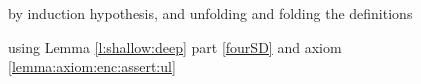 \begin{description}
% 
 
  \item[{}]  by induction hypothesis, and unfolding and folding the definitions
  
 \item[{}]  using Lemma \ref{l:shallow:deep} part \ref{fourSD}  and axiom \ref{lemma:axiom:enc:assert:ul}


\end{description}
